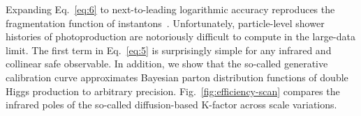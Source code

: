 Expanding Eq.~\eqref{eq:6} to next-to-leading logarithmic accuracy
reproduces the fragmentation function of
instantons~\cite{TPC:1475-KALE-Kolmogorov-Arnold-Attention-Based-Lorentz-Invariant-Emissions-September-20-2026}.
Unfortunately, particle-level shower histories of photoproduction are
notoriously difficult to compute in the large-data limit. The first term
in Eq.~\eqref{eq:5} is surprisingly simple for any infrared and
collinear safe observable. In addition, we show that the so-called
generative calibration curve approximates Bayesian parton distribution
functions of double Higgs production to arbitrary precision.
Fig.~\ref{fig:efficiency-scan} compares the infrared poles of the
so-called diffusion-based K-factor across scale variations.

